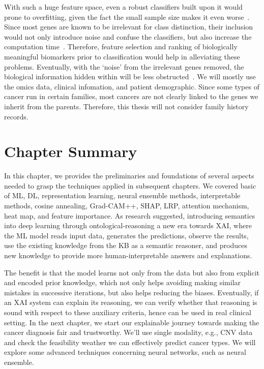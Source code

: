 \hspace*{3.5mm} With such a huge feature space, even a robust classifiers built upon it would prone to overfitting, given the fact the small sample size makes it even worse~\cite{lu2003cancer}. Since most genes are known to be irrelevant for class distinction, their inclusion would not only introduce noise and confuse the classifiers, but also increase the computation time~\cite{lu2003cancer}. Therefore, feature selection and ranking of biologically meaningful biomarkers prior to classification would help in alleviating these problems. 
Eventually, with the `noise' from the irrelevant genes removed, the biological information hidden within will be less  obstructed~\cite{lu2003cancer}. We will mostly use the omics data, clinical infomation, and patient demographic. Since some types of cancer run in certain families, most cancers are not clearly linked to the genes we inherit from the parents. Therefore, this thesis will not consider family history records.

\section{Chapter Summary}
In this chapter, we provides the preliminaries and foundations of several aspects needed to grasp the techniques applied in subsequent chapters. We covered basic of ML, DL, representation learning, neural ensemble methods, interpretable methods, cosine annealing, Grad-CAM++, SHAP, LRP, attention mechanism, heat map, and feature importance. As research suggested, introducing semantics into deep learning through ontological-reasoning a new era towards XAI, where the ML model reads input data, generates the predictions, observe the results, use the existing knowledge from the KB as a semantic reasoner, and produces new knowledge to provide more human-interpretable answers and explanations. 

\hspace*{3.5mm} The benefit is that the model learns not only from the data but also from explicit and encoded prior knowledge, which not only helps avoiding making similar mistakes in successive iterations, but also helps reducing the biases. Eventually, if an XAI system can explain its reasoning, we can verify whether that reasoning is sound with respect to these auxiliary criteria, hence can be used in real clinical setting. In the next chapter, we start our explainable journey towards making the cancer diagnosis fair and trustworthy. We'll use single modality, e.g., CNV data and check the feasibility weather we can effectively predict cancer types. We will explore some advanced techniques concerning neural networks, such as neural ensemble. 